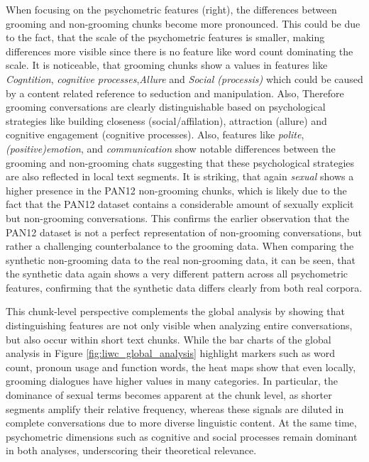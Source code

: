 When focusing on the psychometric features (right), the differences between grooming and non-grooming chunks become more pronounced. This could be due to the fact, that the scale of the psychometric features is smaller, making differences more visible since there is no feature like word count dominating the scale. It is noticeable, that grooming chunks show a values in features like \textit{Cogntition}, \textit{cognitive processes},\textit{Allure} and \textit{Social (processis)} which could be caused by a content related reference to seduction and manipulation.  Also, Therefore grooming conversations are clearly distinguishable based on psychological strategies like building closeness (social/affilation), attraction (allure) and cognitive engagement (cognitive processes). Also, features like \textit{polite}, \textit{(positive)emotion},  and \textit{communication} show notable differences between the grooming and non-grooming chats suggesting that these psychological strategies are also reflected in local text segments. It is striking, that again \textit{sexual} shows a higher presence in the PAN12 non-grooming chunks, which is likely due to the fact that the PAN12 dataset contains a considerable amount of sexually explicit but non-grooming conversations. This confirms the earlier observation that the PAN12 dataset is not a perfect representation of non-grooming conversations, but rather a challenging counterbalance to the grooming data. When comparing the synthetic non-grooming data to the real non-grooming data, it can be seen, that the synthetic data again shows a very different pattern across all psychometric features, confirming that the synthetic data differs clearly from both real corpora. 

This chunk-level perspective complements the global analysis by showing that distinguishing features are not only visible when analyzing entire conversations, but also occur within short text chunks. While the bar charts of the global analysis in Figure \ref{fig:liwc_global_analysis} highlight markers such as word count, pronoun usage and function words, the heat maps show that even locally, grooming dialogues have higher values in many categories. In particular, the dominance of sexual terms becomes apparent at the chunk level, as shorter segments amplify their relative frequency, whereas these signals are diluted in complete conversations due to more diverse linguistic content. At the same time, psychometric dimensions such as cognitive and social processes remain dominant in both analyses, underscoring their theoretical relevance.

